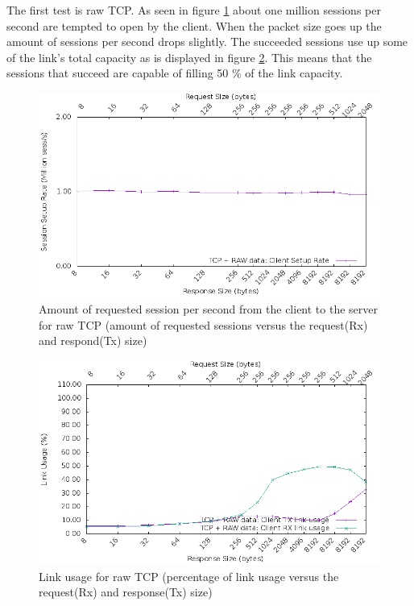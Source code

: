 The first test is raw TCP. As seen in figure \ref{fig:rawtcpsession} about one million sessions per second are tempted to open by the client.
When the packet size goes up the amount of sessions per second drops slightly.
The succeeded sessions use up some of the link's total capacity as is displayed in figure \ref{fig:rawtcplink}.
This means that the sessions that succeed are capable of filling 50 \% of the link capacity.  

\begin{figure}[H]
  \includegraphics[scale=0.6]{images/raw_setup.png}
  \caption{Amount of requested session per second from the client to the server for raw TCP (amount of requested sessions versus the request(Rx) and respond(Tx) size)}
  \label{fig:rawtcpsession}
\end{figure}

\begin{figure}[H]
  \includegraphics[scale=0.6]{images/raw_link_usage.png}
  \caption{Link usage for raw TCP (percentage of link usage versus the request(Rx) and response(Tx) size)}
  \label{fig:rawtcplink}
\end{figure}

